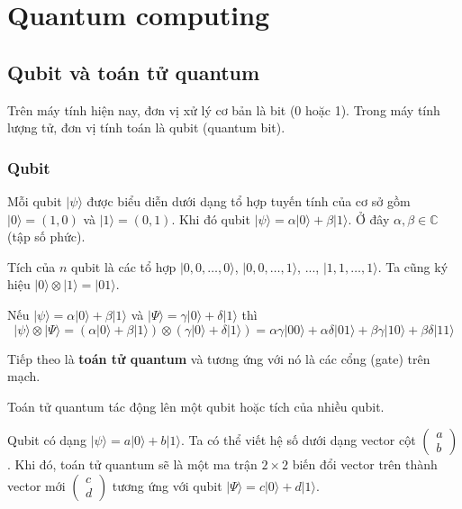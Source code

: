 \chapter*{Quantum computing}

\section{Qubit và toán tử quantum}

Trên máy tính hiện nay, đơn vị xử lý cơ bản là bit (0 hoặc 1). Trong máy tính lượng tử, đơn vị tính toán là qubit (quantum bit).

\subsection*{Qubit}

Mỗi qubit $\lvert \psi \rangle$ được biểu diễn dưới dạng tổ hợp tuyến tính của cơ sở gồm $\lvert 0 \rangle = (1, 0)$ và $\lvert 1 \rangle = (0, 1)$. Khi đó qubit $\lvert \psi \rangle = \alpha \lvert 0 \rangle + \beta \lvert 1 \rangle$. Ở đây $\alpha, \beta \in \mathbb{C}$ (tập số phức).

Tích của $n$ qubit là các tổ hợp $\lvert 0, 0, \ldots, 0 \rangle$, $\lvert 0, 0, \ldots, 1 \rangle$, ..., $\lvert 1, 1, \ldots, 1 \rangle$. Ta cũng ký hiệu $\lvert 0 \rangle \otimes \lvert 1 \rangle = \lvert 01 \rangle$. 

\begin{example}
    Nếu $\lvert \psi \rangle = \alpha \lvert 0 \rangle + \beta \lvert 1 \rangle$ và $\lvert \Psi \rangle = \gamma \lvert 0 \rangle + \delta \lvert 1 \rangle$ thì
    \begin{equation*}
        \lvert \psi \rangle \otimes \lvert \Psi \rangle = (\alpha \lvert 0 \rangle + \beta \lvert 1 \rangle) \otimes (\gamma \lvert 0 \rangle + \delta \lvert 1 \rangle) = \alpha \gamma \lvert 00 \rangle + \alpha \delta \lvert 0 1 \rangle + \beta \gamma \lvert 10 \rangle + \beta \delta \lvert 11 \rangle
    \end{equation*}
\end{example}

Tiếp theo là \textbf{toán tử quantum} và tương ứng với nó là các cổng (gate) trên mạch.

Toán tử quantum tác động lên một qubit hoặc tích của nhiều qubit.

Qubit có dạng $\lvert \psi \rangle = a \lvert 0 \rangle + b \lvert 1 \rangle$. Ta có thể viết hệ số dưới dạng vector cột $\begin{pmatrix} a \\ b \end{pmatrix}$. Khi đó, toán tử quantum sẽ là một ma trận $2 \times 2$ biến đổi vector trên thành vector mới $\begin{pmatrix} c \\ d \end{pmatrix}$ tương ứng với qubit $\lvert \Psi \rangle = c \lvert 0 \rangle + d \lvert 1 \rangle$.

